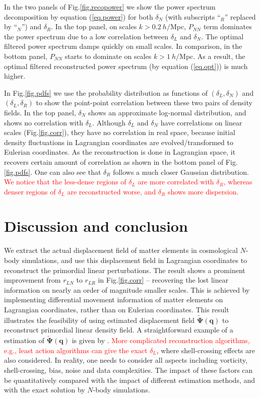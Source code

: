 \documentclass[aps,prd,twocolumn,superscriptaddress,amsfont,amssymb,amsmath,nofootinbib,showpacs,balancelastpage]{revtex4-1}
\newcommand{\bs}{\boldsymbol}
\newcommand{\tcr}{\textcolor{red}}
\begin{document}
In the two panels of Fig.\ref{fig.recopower} we show the power spectrum
decomposition by equation (\ref{eq.power}) for both $\delta_N$ 
(with subscripts ``$_R$'' replaced by ``$_N$'') and $\delta_R$.
In the top panel, on scales $k>0.2\ h/$Mpc,
$P_{NN}$ term dominates the power spectrum due to a low correlation
between $\delta_L$ and $\delta_N$. The optimal filtered power spectrum
damps quickly on small scales. In comparison, in the bottom panel,
$P_{NN}$ starts to dominate on scales $k>1\ h/$Mpc. As a result, the
optimal filtered reconstructed power spectrum
(by equation (\ref{eq.opt})) is much higher.

In Fig.\ref{fig.pdfs} we use the probability distribution
as functions of $(\delta_L,\delta_N)$ and $(\delta_L,\delta_R)$
to show the point-point correlation between these two pairs of density
fields. In the top panel, $\delta_N$ shows an approximate log-normal
distribution, and shows no correlation with $\delta_L$. Although
$\delta_L$ and $\delta_N$ have correlations on linear scales (Fig.\ref{fig.corr}),
they have no correlation in real space, because initial density fluctuations
in Lagrangian coordinates are evolved/transformed to Eulerian coordinates.
As the reconstruction is done in Lagrangian space, it recovers
certain amount of correlation as shown in the bottom panel
of Fig.\ref{fig.pdfs}. One can also see that $\delta_R$ follows
a much closer Gaussian distribution.
\tcr{We notice that the less-dense regions of $\delta_L$ are more
correlated with $\delta_R$, whereas denser regions of $\delta_L$ are
reconstructed worse, and $\delta_R$ shows more dispersion.}

\section{Discussion and conclusion}\label{sec.discussion}
We extract the actual displacement field of matter elements in cosmological $N$-body
simulations, and use this displacement field in Lagrangian coordinates to reconstruct
the primordial linear perturbations. The result shows a prominent improvement from
$r_{LN}$ to $r_{LR}$ in Fig.\ref{fig.corr} -- recovering the lost linear information on
nearly an order of magnitude smaller scales.
This is achieved by implementing differential movement information
of matter elements on Lagrangian coordinates, rather than on
Eulerian coordinates. This result illustrates the feasibility
of using estimated displacement field $\tilde{\bs \Psi}(\bs q)$ to reconstruct primordial linear
density field. A straightforward example of a estimation of $\tilde{\bs \Psi}(\bs q)$
is given by \cite{1995ApJS..100..269P,1998ApJS..115...19P}.
\tcr{More complicated reconstruction algorithms, e.g., least action
algorithms \cite{1989ApJ...344L..53P,2000ApJ...544...21G} can give
the exact $\delta_L$}, where
shell-crossing effects are also considered. In reality, one needs
to consider all aspects including vorticity, shell-crossing, bias, noise
and data complexities. The impact of these factors can be quantitatively
compared with the impact of different estimation methods, and with
the exact solution by $N$-body simulations.
\end{document}
